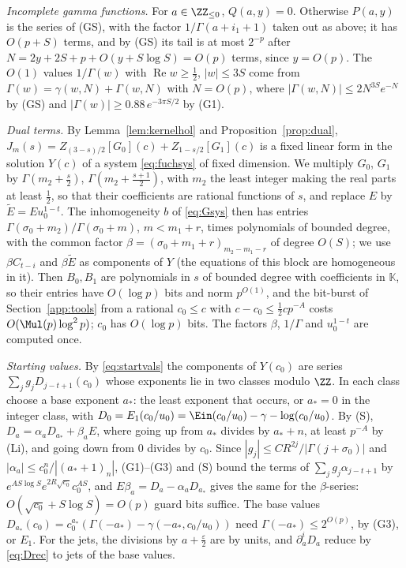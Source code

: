 \begin{small}
\emph{Incomplete gamma functions.} For $a \in \ZZ_{\le0}$, $Q(a,y) = 0$. Otherwise $P(a,y)$ is the series of (GS),
with the factor $1/\Gamma(a + i_1 + 1)$ taken out as above; it has $O(p + S)$ terms, and by (GS) its tail is at most
$2^{-p}$ after $N = 2y + 2S + p + O(y + S\log S) = O(p)$ terms, since $y = O(p)$. The
$O(1)$ values $1/\Gamma(w)$ with $\operatorname{Re}w \ge \frac12$, $|w| \le 3S$ come from
$\Gamma(w) = \gamma(w, N) + \Gamma(w, N)$ with $N = O(p)$, where $|\Gamma(w,N)| \le 2N^{3S}e^{-N}$ by (GS) and
$|\Gamma(w)| \ge 0.88\,e^{-3\pi S/2}$ by (G1).

\emph{Dual terms.}\label{app:dual} By Lemma~\ref{lem:kernelhol} and Proposition~\ref{prop:dual},
$J_m(s) = Z_{(3-s)/2}[G_0](c) + Z_{1-s/2}[G_1](c)$ is a fixed linear form in the solution $Y(c)$ of a system
\eqref{eq:fuchsys} of fixed dimension. We multiply $G_0$, $G_1$ by $\Gamma(m_2 + \frac s2)$, $\Gamma(m_2 + \frac{s+1}2)$,
with $m_2$ the least integer making the real parts at least $\frac12$, so that their coefficients are rational
functions of $s$, and replace $E$ by $\widetilde E = Eu_0^{1-t}$. The inhomogeneity $b$ of \eqref{eq:Gsys} then has
entries $\Gamma(\sigma_0+m_2)/\Gamma(\sigma_0+m)$, $m < m_1 + r$, times polynomials of bounded degree, with the common
factor $\beta = (\sigma_0 + m_1 + r)_{m_2-m_1-r}$ of degree $O(S)$; we use $\beta C_{t-i}$ and $\beta\widetilde E$ as
components of $Y$ (the equations of this block are homogeneous in it). Then $B_0, B_1$ are polynomials in $s$ of bounded
degree with coefficients in $\mathbb K$, so their entries have $O(\log p)$ bits and norm $p^{O(1)}$, and the bit-burst
of Section~\ref{app:tools} from a rational $c_0 \le c$ with $c - c_0 \le \frac12cp^{-A}$ costs $O(\Mul(p)\log^2p)$;
$c_0$ has $O(\log p)$ bits. The factors $\beta$, $1/\Gamma$ and $u_0^{1-t}$ are computed once.

\emph{Starting values.} By \eqref{eq:startvals} the components of $Y(c_0)$ are series $\sum_jg_jD_{j-t+1}(c_0)$ whose
exponents lie in two classes modulo $\ZZ$. In each class choose a base exponent $a_*$: the least exponent that occurs,
or $a_* = 0$ in the integer class, with $D_0 = E_1(c_0/u_0) = \Ein(c_0/u_0) - \gamma - \log(c_0/u_0)$. By (S),
$D_a = \alpha_aD_{a_*} + \beta_aE$, where going up from $a_*$ divides by $a_* + n$, at least $p^{-A}$ by (Li), and
going down from $0$ divides by $c_0$. Since $|g_j| \le CR^{2j}/|\Gamma(j+\sigma_0)|$ and
$|\alpha_a| \le c_0^n/|(a_*+1)_n|$, (G1)--(G3) and (S) bound the terms of $\sum_jg_j\alpha_{j-t+1}$ by
$e^{AS\log S}e^{2R\sqrt{c_0}}c_0^{AS}$, and $E\beta_a = D_a - \alpha_aD_{a_*}$ gives the same for the $\beta$-series:
$O(\sqrt{c_0} + S\log S) = O(p)$ guard bits suffice. The base values $D_{a_*}(c_0) = c_0^{a_*}(\Gamma(-a_*) - \gamma(-a_*, c_0/u_0))$
need $\Gamma(-a_*) \le 2^{O(p)}$, by (G3), or $E_1$. For the jets, the divisions by $a + \frac\varepsilon2$ are by
units, and $\partial_a^iD_a$ reduce by \eqref{eq:Drec} to jets of the base values.


\end{small}
